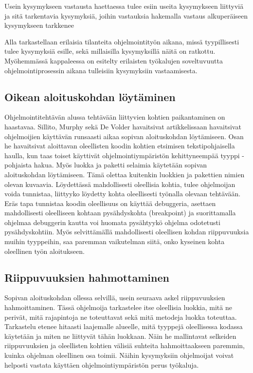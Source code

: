 \documentclass[finnish]{../tktltiki2}
\theoremstyle{definition}
\theoremstyle{remark}
\begin{document}
Usein kysymykseen vastausta haettaessa tulee esiin useita kysymykseen liittyviä ja sitä tarkentavia kysymyksiä, joihin vastauksia hakemalla vastaus alkuperäiseen kysymykseen tarkkenee~\cite{questions-during-software-evolution-tasks}

Alla tarkastellaan erilaisia tilanteita ohjelmointityön aikana, missä tyypillisesti tulee kysymyksiä esille, sekä millaisilla kysymyksillä näitä on ratkottu. Myöhemmässä kappaleessa on esitelty erilaisten työkalujen soveltuvuutta ohjelmointiprosessin aikana tulleisiin kysymyksiin vastaamisesta.
\subsection{Oikean aloituskohdan löytäminen}
Ohjelmointitehtävän alussa tehtävään liittyvien kohtien paikantaminen on haastavaa. Sillito, Murphy sekä De Volder havaitsivat artikkelissaan \cite{questions-during-software-evolution-tasks} havaitsivat ohjelmoijien käyttävän runsaasti aikaa sopivan aloituskohdan löytämiseen. Osan he havaitsivat aloittavan oleellisten koodin kohtien etsimisen tekstipohjaisella haulla, kun taas toiset käyttivät ohjelmointiympäristön kehittyneempää tyyppi -pohjaista hakua. Myös luokka ja paketti selaimia käytetään sopivan aloituskohdan löytämiseen. Tämä olettaa kuitenkin luokkien ja pakettien nimien olevan kuvaavia. Löydettässä mahdollisesti oleellisia kohtia, tulee ohjelmoijan voida tunnistaa, liittyyko löydetty kohta oleellisesti työnalla olevaan tehtävään. Eräs tapa tunnistaa koodin oleellisuus on käyttää debuggeria, asettaen mahdollisesti oleelliseen kohtaan pysähdyskohta (breakpoint) ja suorittamalla ohjelmaa debuggerin kautta voi huomata pysähtyykö ohjelma odotetusti pysähdyskohtiin. Myös selvittämällä mahdollisesti oleellisen kohdan riippuvuuksia muihin tyyppeihin, saa paremman vaikutelman siitä, onko kyseinen kohta oleellinen työn aloitukseen.

\subsection{Riippuvuuksien hahmottaminen}
Sopivan aloituskohdan ollessa selvillä, usein \cite{questions-during-software-evolution-tasks} seuraava askel riippuvuuksien hahmoittaminen. Tässä ohjelmoija tarkastelee itse oleellisia luokkia, mitä ne perivät, mitä rajapintoja ne toteuttavat sekä mitä metodeja luokka toteuttaa. Tarkastelu etenee hitaasti laajemalle alueelle, mitä tyyppejä oleellisessa kodassa käytetään ja miten ne liittyvät tähän luokkaan. Näin he mallintavat selkeiden riippuvuuksien ja oleellisten kohtien välisiä suhteita hahmoittaakseen paremmin, kuinka ohjelman oleellinen osa toimii.
Näihin kysymyksiin ohjelmoijat voivat helposti vastata käyttäen ohjelmointiympäristön perus työkaluja.
\end{document}
